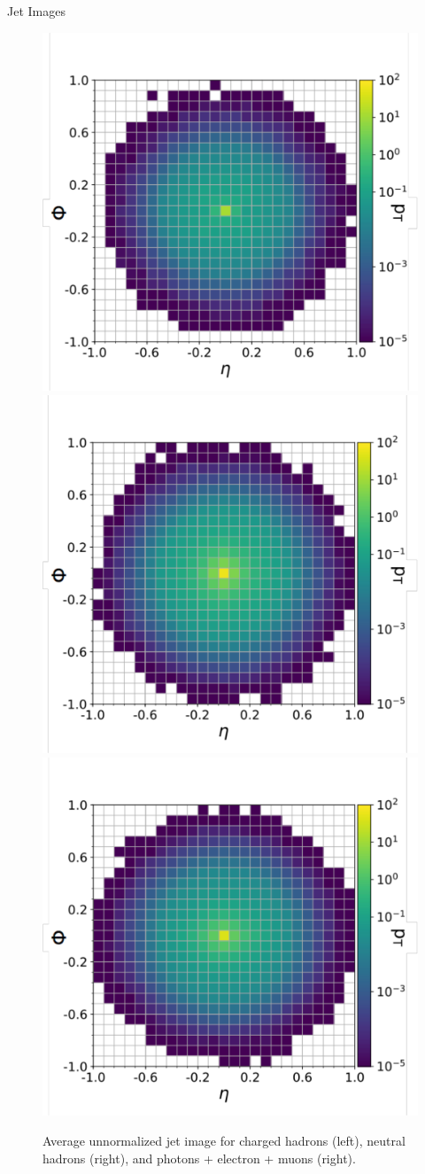 \begin{section}{Jet Images}
\begin{figure}[tbp!]
\begin{center}
\includegraphics[angle=0,width=0.32\columnwidth]{fig/avgch_image.pdf}
\includegraphics[angle=0,width=0.32\columnwidth]{fig/avgnh_image.pdf}
\includegraphics[angle=0,width=0.32\columnwidth]{fig/avgph_image.pdf}
\end{center}
\caption{Average unnormalized jet image for charged hadrons (left), neutral hadrons (right), and photons + electron + muons (right).}
\label{fig:jetimage_avg}
\end{figure}

\end{section}

